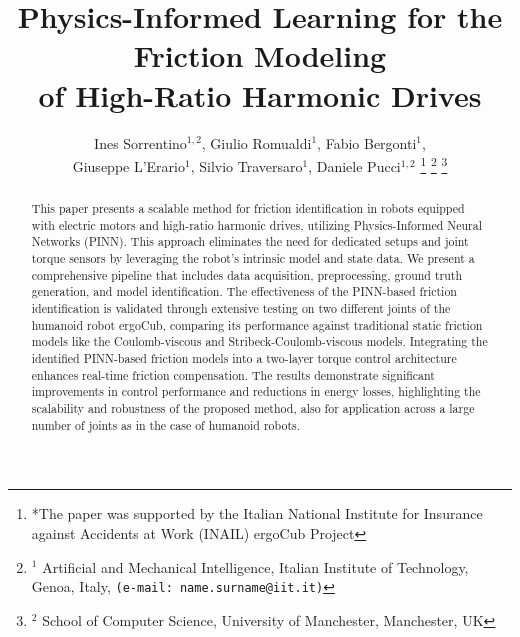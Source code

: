 \documentclass[letterpaper, 10 pt, conference]{ieeeconf}  %
\title{\LARGE \bf
Physics-Informed Learning for the Friction Modeling \\ of High-Ratio Harmonic Drives}
\author{Ines Sorrentino$^{1,2}$, Giulio Romualdi$^{1}$, Fabio Bergonti$^{1}$, \\ Giuseppe L'Erario$^{1}$, Silvio Traversaro$^{1}$, Daniele Pucci$^{1,2}$%
\thanks{*The paper was supported by the Italian National Institute for Insurance against Accidents at Work (INAIL) ergoCub Project}%
\thanks{${}^{1}$ Artificial and Mechanical Intelligence, Italian Institute of Technology, Genoa, Italy, {\tt\small (e-mail: name.surname@iit.it)}}
\thanks{${}^{2}$  School of Computer Science, University of Manchester, Manchester, UK}%
}
\begin{document}
\maketitle
\thispagestyle{empty}
\pagestyle{empty}


\begin{abstract}
This paper presents a scalable method for friction identification in robots equipped with electric motors and high-ratio harmonic drives, utilizing Physics-Informed Neural Networks (PINN). This approach eliminates the need for dedicated setups and joint torque sensors by leveraging the robot’s intrinsic model and state data. We present a comprehensive pipeline that includes data acquisition, preprocessing, ground truth generation, and model identification. The effectiveness of the PINN-based friction identification is validated through extensive testing on two different joints of the humanoid robot ergoCub, comparing its performance against traditional static friction models like the Coulomb-viscous and Stribeck-Coulomb-viscous models. Integrating the identified PINN-based friction models into a two-layer torque control architecture enhances real-time friction compensation. The results demonstrate significant improvements in control performance and reductions in energy losses, highlighting the scalability and robustness of the proposed method, also for application across a large number of joints as in the case of humanoid robots.

\end{abstract}
\end{document}
